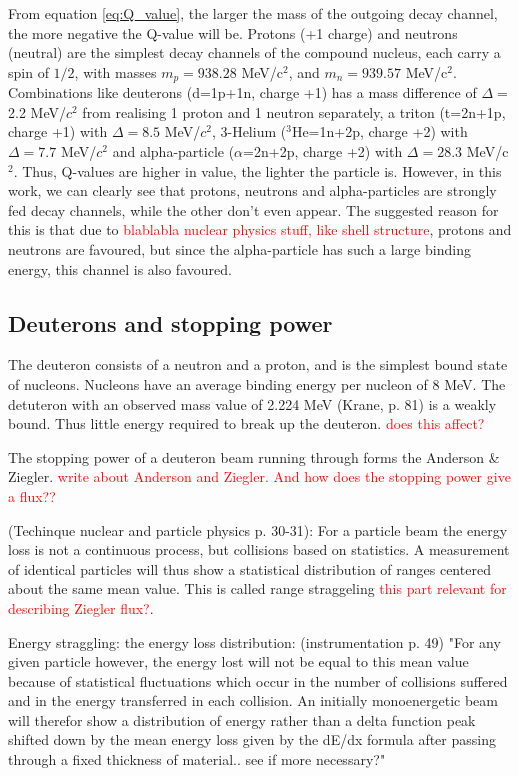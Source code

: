 From equation \ref{eq:Q_value}, the larger the mass of the outgoing decay channel, the more negative the Q-value will be. Protons (+1 charge) and neutrons (neutral) are the simplest decay channels of the compound nucleus, each carry a spin of $1/2$, with masses $m_p=938.28$ MeV/c$^2$, and $m_n=939.57$ MeV/c$^2$. Combinations like deuterons (d=1p+1n, charge +1) has a mass difference of $\Delta=$2.2 MeV/$c^2$ from realising 1 proton and 1 neutron separately, a triton (t=2n+1p, charge +1) with $\Delta=8.5$ MeV/$c^2$,  3-Helium ($^{3}$He=1n+2p, charge +2) with $\Delta=7.7$ MeV/$c^2$ and alpha-particle ($\alpha$=2n+2p, charge +2) with $\Delta=28.3$ MeV/c$^2$. Thus, Q-values are higher in value, the lighter the particle is. However, in this work, we can clearly see that protons, neutrons and alpha-particles are strongly fed decay channels, while the other don't even appear. The suggested reason for this is that due to \textcolor{red}{blablabla nuclear physics stuff, like shell structure}, protons and neutrons are favoured, but since the alpha-particle has such a large binding energy, this channel is also favoured.  

\subsection{Deuterons and stopping power}

The deuteron consists of a neutron and a proton, and is the simplest bound state of nucleons. Nucleons have an average binding energy per nucleon of 8 MeV. The detuteron with an observed mass value of 2.224 MeV (Krane, p. 81) is a weakly bound. Thus little energy required to break up the deuteron. \textcolor{red}{does this affect?}

The stopping power of a deuteron beam running through forms the Anderson \& Ziegler. \textcolor{red}{write about Anderson and Ziegler. And how does the stopping power give a flux??}


(Techinque nuclear and particle physics p. 30-31):  
For a particle beam the energy loss is not a continuous process, but collisions based on statistics. A measurement of identical particles will thus show a statistical distribution of ranges centered about the same mean value. This is called range straggeling \textcolor{red}{this part relevant for describing Ziegler flux?}. 

Energy straggling: the energy loss distribution: (instrumentation p. 49)
"For any given particle however, the energy lost will not be equal to this mean value because of statistical fluctuations which occur in the number of collisions suffered and in the energy transferred in each collision. An initially monoenergetic beam will therefor show a distribution of energy rather than a delta function peak shifted down by the mean energy loss given by the dE/dx formula after passing through a fixed thickness of material.. see if more necessary?"

